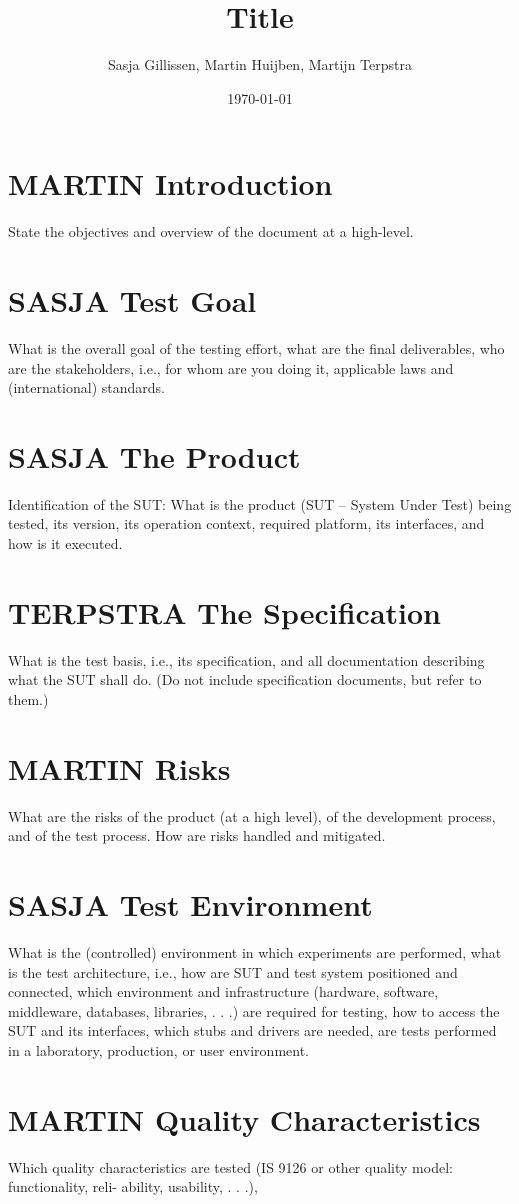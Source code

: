 \documentclass[11pt,a4paper]{article}
\author{Sasja Gillissen, Martin Huijben, Martijn Terpstra}
\date{\today}
\title{Title}
\begin{document}
\maketitle

\section{MARTIN Introduction}
State the objectives and overview of the document at a high-level.
\section{SASJA Test Goal}
What is the overall goal of the testing effort, what are the final deliverables, who are the
stakeholders, i.e., for whom are you doing it, applicable laws and (international) standards.
\section{SASJA The Product}
Identification of the SUT: What is the product (SUT – System Under Test) being tested, its
version, its operation context, required platform, its interfaces, and how is it executed.
\section{TERPSTRA The Specification}
What is the test basis, i.e., its specification, and all documentation describing what the SUT
shall do. (Do not include specification documents, but refer to them.)
\section{MARTIN Risks}
What are the risks of the product (at a high level), of the development process, and of the
test process. How are risks handled and mitigated.
\section{SASJA Test Environment}
What is the (controlled) environment in which experiments are performed, what is the test
architecture, i.e., how are SUT and test system positioned and connected, which environment
and infrastructure (hardware, software, middleware, databases, libraries, . . .) are required for
testing, how to access the SUT and its interfaces, which stubs and drivers are needed, are
tests performed in a laboratory, production, or user environment.
\section{MARTIN Quality Characteristics}
Which quality characteristics are tested (IS 9126 or other quality model: functionality, reli-
ability, usability, . . .),
\end{document}
